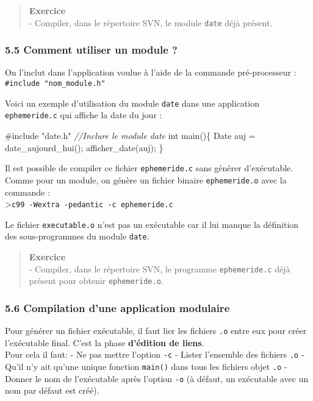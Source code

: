 \documentclass[11pt]{article}
\newenvironment{Shaded}{}{}
\newcommand{\DataTypeTok}[1]{\textcolor[rgb]{0.56,0.13,0.00}{{#1}}}
\newcommand{\CommentTok}[1]{\textcolor[rgb]{0.38,0.63,0.69}{\textit{{#1}}}}
\newcommand{\NormalTok}[1]{{#1}}
\newcommand{\ImportTok}[1]{{#1}}
\newcommand{\PreprocessorTok}[1]{\textcolor[rgb]{0.74,0.48,0.00}{{#1}}}
\begin{document}
\begin{quote}
\textbf{Exercice}\\
- Compiler, dans le répertoire SVN, le module \texttt{date} déjà
présent.
\end{quote}

    \subsubsection{5.5 Comment utiliser un module
?}\label{comment-utiliser-un-module}

On l'inclut dans l'application voulue à l'aide de la commande
pré-processeur :\\
\texttt{\#include\ "nom\_module.h"}

Voici un exemple d'utilisation du module \texttt{date} dans une
application \texttt{ephemeride.c} qui affiche la date du jour :

\begin{Shaded}
\begin{Highlighting}[]
\PreprocessorTok{#include }\ImportTok{"date.h"}\PreprocessorTok{   }\CommentTok{//Inclure le module date}
\DataTypeTok{int}\NormalTok{ main()\{}
\NormalTok{    Date auj = date_aujourd_hui();}
\NormalTok{    afficher_date(auj);}
\NormalTok{\}}
\end{Highlighting}
\end{Shaded}

Il est possible de compiler ce fichier \texttt{ephemeride.c} sans
générer d'exécutable. Comme pour un module, on génère un fichier binaire
\texttt{ephemeride.o} avec la commande :\\
\textgreater{}\texttt{c99\ -Wextra\ -pedantic\ -c\ ephemeride.c}

Le fichier \texttt{executable.o} n'est pas un exécutable car il lui
manque la définition des sous-programmes du module \texttt{date}.

\begin{quote}
\textbf{Exercice}\\
- Compiler, dans le répertoire SVN, le programme \texttt{ephemeride.c}
déjà présent pour obtenir \texttt{ephemeride.o}.
\end{quote}

    \subsubsection{5.6 Compilation d'une application
modulaire}\label{compilation-dune-application-modulaire}

Pour générer un fichier exécutable, il faut lier les fichiers
\texttt{.o} entre eux pour créer l'exécutable final. C'est la phase
\textbf{d'édition de liens}.\\
Pour cela il faut: - Ne pas mettre l'option \texttt{-c} - Lister
l'ensemble des fichiers \texttt{.o} - Qu'il n'y ait qu'une unique
fonction \texttt{main()} dans tous les fichiers objet \texttt{.o} -
Donner le nom de l'exécutable après l'option \texttt{-o} (à défaut, un
exécutable avec un nom par défaut est créé).
\end{document}
